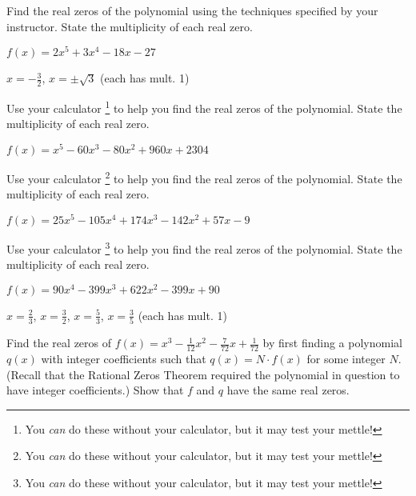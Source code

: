 \documentclass{ximera}
\begin{document}
\begin{problem}\label{findrealzerosexerlast}
Find the real zeros of the polynomial using the techniques specified by your instructor.  State the multiplicity of each real zero.

$f(x) = 2x^5+3x^4-18x-27$ 
\begin{solution}
$x = -\frac{3}{2}$, $x = \pm \sqrt{3}$ (each has mult. 1)
\end{solution}
\end{problem}

\begin{problem}\label{realzeroswcalcfirst}
Use your calculator \footnote{You \textit{can} do these without your calculator, but it may test your mettle!} to help you find the real zeros of the polynomial.  State the multiplicity of each real zero.

$f(x) = x^{5} - 60x^{3} - 80x^{2} + 960x + 2304$
\end{problem}

\begin{problem}
Use your calculator \footnote{You \textit{can} do these without your calculator, but it may test your mettle!} to help you find the real zeros of the polynomial.  State the multiplicity of each real zero.

$f(x) = 25x^{5} - 105x^{4} + 174x^{3} - 142x^{2} + 57x - 9$
\end{problem}

\begin{problem}\label{realzeroswcalclast}
Use your calculator \footnote{You \textit{can} do these without your calculator, but it may test your mettle!} to help you find the real zeros of the polynomial.  State the multiplicity of each real zero.

$f(x) = 90x^{4} - 399x^{3} + 622x^{2} - 399x + 90$

\begin{solution}
$x = \frac{2}{3}$, $x = \frac{3}{2}$, $x = \frac{5}{3}$, $x = \frac{3}{5}$ (each has mult. 1)
\end{solution}
\end{problem}

\begin{problem}
Find the real zeros of $f(x) = x^{3} - \frac{1}{12}x^{2} - \frac{7}{72}x + \frac{1}{72}$ by first finding a polynomial $q(x)$ with integer coefficients such that $q(x) = N \cdot f(x)$ for some integer $N$.  (Recall that the Rational Zeros Theorem required the polynomial in question to have integer coefficients.) Show that $f$ and $q$ have the same real zeros.
\end{problem}
\end{document}
